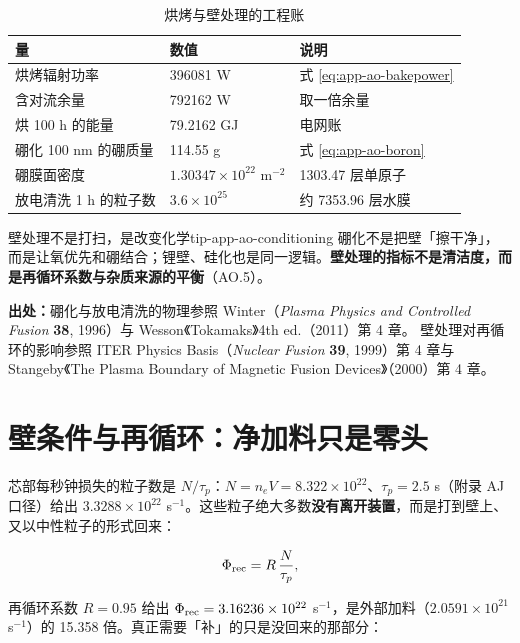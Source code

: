 \begin{table}[htbp]
\centering
\caption{烘烤与壁处理的工程账}
\label{tab:app-ao-conditioning}
{\small
\begin{tabular}{p{4.8cm}p{3.4cm}p{6.4cm}}
\toprule
量 & 数值 & 说明 \\
\midrule
烘烤辐射功率 & 396081 W & 式 \eqref{eq:app-ao-bakepower} \\
含对流余量 & 792162 W & 取一倍余量 \\
烘 100 h 的能量 & 79.2162 GJ & 电网账 \\
硼化 100 nm 的硼质量 & 114.55 g & 式 \eqref{eq:app-ao-boron} \\
硼膜面密度 & $1.30347\times10^{22}$ m$^{-2}$ & 1303.47 层单原子 \\
放电清洗 1 h 的粒子数 & $3.6\times10^{25}$ & 约 7353.96 层水膜 \\
\bottomrule
\end{tabular}}
\end{table}

\begin{tip}{壁处理不是打扫，是改变化学}{tip-app-ao-conditioning}
硼化不是把壁「擦干净」，而是让氧优先和硼结合；锂壁、硅化也是同一逻辑。\textbf{壁处理的指标不是清洁度，而是再循环系数与杂质来源的平衡}（AO.5）。
\end{tip}

{\small

\textbf{出处：}硼化与放电清洗的物理参照 Winter（\textit{Plasma Physics and Controlled Fusion} \textbf{38}, 1996）与 Wesson《Tokamaks》4th ed.（2011）第 4 章。
壁处理对再循环的影响参照 ITER Physics Basis（\textit{Nuclear Fusion} \textbf{39}, 1999）第 4 章与 Stangeby《The Plasma Boundary of Magnetic Fusion Devices》（2000）第 4 章。
\section{壁条件与再循环：净加料只是零头}
\label{sec:app-ao-recycling}
}

芯部每秒钟损失的粒子数是 $N/\tau_p$：$N=n_eV=8.322\times10^{22}$、$\tau_p=2.5$ s（附录 AJ 口径）给出 $3.3288\times10^{22}$ s$^{-1}$。这些粒子绝大多数\textbf{没有离开装置}，而是打到壁上、又以中性粒子的形式回来：

\begin{equation}
\Phi_{\rm rec}=R\,\frac{N}{\tau_p},
\label{eq:app-ao-recycle}
\end{equation}

再循环系数 $R=0.95$ 给出 $\Phi_{\rm rec}=3.16236\times10^{22}$ s$^{-1}$，是外部加料（$2.0591\times10^{21}$ s$^{-1}$）的 15.358 倍。真正需要「补」的只是没回来的那部分：

